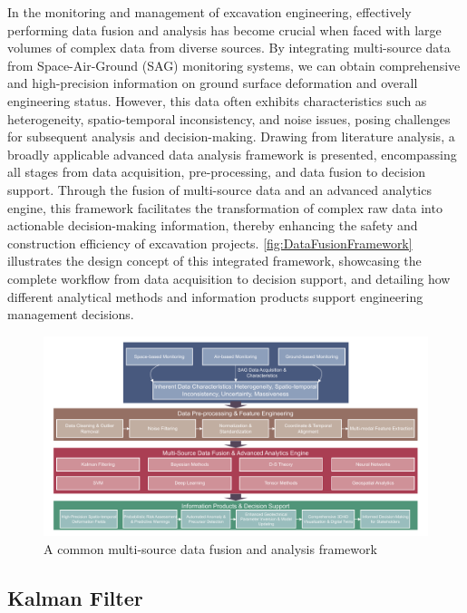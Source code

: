 \documentclass[preprint,11pt,authoryear,3p]{elsarticle}
\begin{document}
In the monitoring and management of excavation engineering, effectively performing data fusion and analysis has become crucial when faced with large volumes of complex data from diverse sources. By integrating multi-source data from Space-Air-Ground (SAG) monitoring systems, we can obtain comprehensive and high-precision information on ground surface deformation and overall engineering status. However, this data often exhibits characteristics such as heterogeneity, spatio-temporal inconsistency, and noise issues, posing challenges for subsequent analysis and decision-making. Drawing from literature analysis, a broadly applicable advanced data analysis framework is presented, encompassing all stages from data acquisition, pre-processing, and data fusion to decision support. Through the fusion of multi-source data and an advanced analytics engine, this framework facilitates the transformation of complex raw data into actionable decision-making information, thereby enhancing the safety and construction efficiency of excavation projects. \autoref{fig:DataFusionFramework} illustrates the design concept of this integrated framework, showcasing the complete workflow from data acquisition to decision support, and detailing how different analytical methods and information products support engineering management decisions.

\begin{figure}[h]
    \centering 
    \includegraphics[width=\textwidth]{imgs/IntegratedAnalysis.pdf}
    \caption{A common multi-source data fusion and analysis framework}
    \label{fig:DataFusionFramework}
\end{figure}

\subsection{Kalman Filter}
\end{document}
